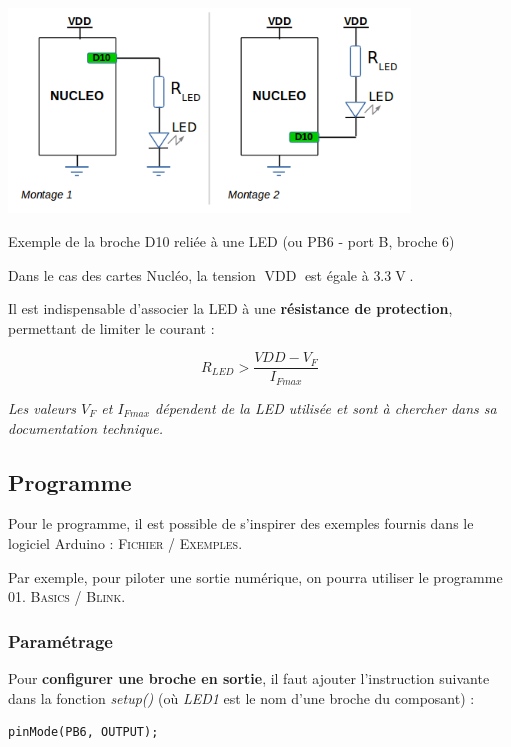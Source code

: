 \documentclass[a4paper,11pt,titlepage]{article} %
\begin{document}
\begin{center}
	\includegraphics[width=0.8\textwidth]{images/MINE_Nucleo_LED_Connexion.png}
	
	Exemple de la broche D10 reliée à une LED (ou PB6 - port B, broche 6)
\end{center}

Dans le cas des cartes Nucléo, la tension $\operatorname{VDD}$ est égale à $3.3\operatorname{V}$.

Il est indispensable d'associer la LED à une \textbf{résistance de protection}, permettant de limiter le courant : 

$$R_{LED} > \frac{VDD - V_{F}}{I_{Fmax}}$$

\textit{Les valeurs $V_F$ et $I_{Fmax}$ dépendent de la LED utilisée et sont à chercher dans sa documentation technique.}



\subsection{Programme}

Pour le programme, il est possible de s'inspirer des exemples fournis dans le logiciel Arduino : \textsc{Fichier / Exemples}.

Par exemple, pour piloter une sortie numérique, on pourra utiliser le programme \textsc{01. Basics / Blink}.

\subsubsection{Paramétrage}

Pour \textbf{configurer une broche en sortie}, il faut ajouter l'instruction suivante dans la fonction \textsl{setup()} (où \textsl{LED1} est le nom d'une broche du composant) :

\begin{lstlisting}
pinMode(PB6, OUTPUT);
\end{lstlisting}
\end{document}
